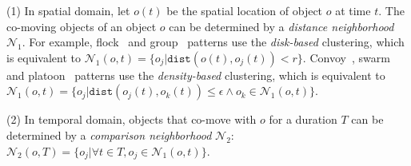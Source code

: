 	(1) In spatial domain, let $o(t)$ be the spatial location of object $o$ at time $t$. The co-moving objects of an object $o$
	can be determined by a \emph{distance neighborhood} $\mathcal{N}_1$. For example,  flock~\cite{gudmundsson2006computing} and group~\cite{wang2006grouppattern} patterns use the \emph{disk-based} clustering, which is equivalent to $\mathcal{N}_1(o, t)= \{o_j | \mathtt{dist}(o(t),o_j(t)) < r \}$. Convoy~\cite{jeung2008discovery}, swarm~\cite{li2010swarm} and platoon~\cite{li2015platoon} patterns use the \emph{density-based} clustering, which is equivalent to $\mathcal{N}_1(o,t)= \{o_j | \mathtt{dist}(o_j(t),o_k(t)) \leq \epsilon \wedge o_k \in \mathcal{N}_1(o,t)\}$.
%	
%	
%	
	
	(2) In temporal domain, objects that co-move with $o$ for a duration $T$ can be determined by
	a \emph{comparison neighborhood} $\mathcal{N}_2$:
	$\mathcal{N}_2(o, T)=\{o_j| \forall t \in T, o_j \in \mathcal{N}_1(o,t) \}$.%

